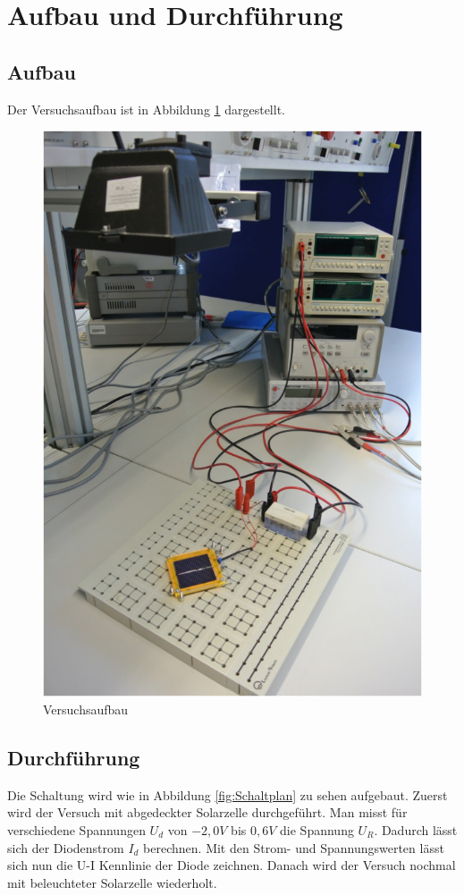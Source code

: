 \documentclass[a4paper]{scrartcl}
\numberwithin{equation}{subsection}
\begin{document}
\newpage
\section{Aufbau und Durchführung}
\subsection{Aufbau}
Der Versuchsaufbau ist in Abbildung \ref{fig:Aufbau} dargestellt.

\begin{figure}[H]
\includegraphics[width=14cm]{Aufbau}
\centering
\caption{Versuchsaufbau}
\centering
\label{fig:Aufbau}
\end{figure}

\subsection{Durchführung}
Die Schaltung wird wie in Abbildung \ref{fig:Schaltplan} zu sehen
aufgebaut. Zuerst wird der Versuch mit abgedeckter Solarzelle durchgeführt. Man misst für verschiedene
Spannungen $U_d$ von $-2,0V$ bis $0,6V$ die Spannung $U_R$. Dadurch lässt sich der Diodenstrom $I_d$
berechnen. Mit den Strom- und Spannungswerten lässt sich nun die U-I Kennlinie der Diode zeichnen. Danach 
wird der Versuch nochmal mit beleuchteter Solarzelle wiederholt.
\end{document}
